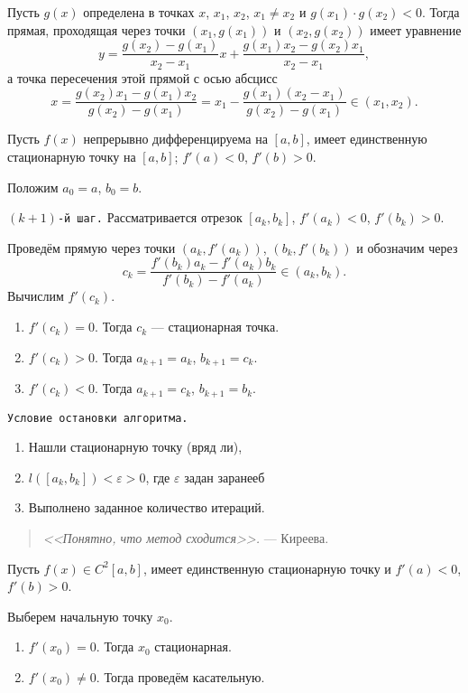 \begin{alg}
  \begin{remark*} Пусть $ g(x) $ определена в точках $ x $, $ x_1 $, $ x_2 $, $
    x_1 \neq x_2 $ и $ g(x_1)\cdot g(x_2) < 0 $. Тогда прямая, проходящая через
    точки $ (x_1, g(x_1)) $ и $ (x_2, g(x_2)) $ имеет уравнение  
    \[
        y = \frac{g(x_2) - g(x_1)}{x_2 - x_1} x + \frac{g(x_1)x_2 -
        g(x_2)x_1}{x_2 - x_1},
    \]
   а точка пересечения этой прямой с осью абсцисс  
   \[
       x = \frac{g(x_2)x_1 - g(x_1)x_2}{g(x_2) - g(x_1)} = x_1 -
       \frac{g(x_1)(x_2-x_1)}{g(x_2) - g(x_1)} \in (x_1, x_2).
   \]
 \end{remark*}

 Пусть $ f(x) $ непрерывно дифференцируема на $ [a,b] $, имеет единственную
 стационарную точку на $ [a, b] $; $ f'(a) < 0 $, $ f'(b) > 0 $.

 Положим $ a_0 = a $, $ b_0 = b $.

 \texttt{$ (k+1) $-й шаг.} Рассматривается отрезок $ [a_k, b_k] $, $ f'(a_k) < 0
 $, $ f'(b_k) > 0 $. 

 Проведём прямую через точки $ (a_k, f'(a_k)) $, $ (b_k, f'(b_k)) $ и обозначим
 через 
 \[
     c_k = \frac{f'(b_k)a_k - f'(a_k)b_k}{f'(b_k) - f'(a_k)} \in (a_k, b_k).
 \]
Вычислим $ f'(c_k) $.
\begin{enumerate}[label=(\roman*).]
  \item $f'(c_k) = 0$. Тогда $ c_k  $ --- стационарная точка.
  \item $ f'(c_k) > 0 $. Тогда $ a_{k+1} = a_k $, $ b_{k+1} = c_k $.
  \item $ f'(c_k) < 0 $. Тогда $ a_{k+1} = c_k $, $ b_{k+1} = b_k $.
\end{enumerate}

\texttt{Условие остановки алгоритма.}
\begin{enumerate}[label=(\alph*)]
  \item Нашли стационарную точку (вряд ли),
  \item $ l([a_k, b_k]) < \varepsilon > 0$, где $ \varepsilon $ задан заранееб
  \item Выполнено заданное количество итераций.
\end{enumerate}

\begin{quotation}
  \emph{<<Понятно, что метод сходится>>.}
  \flushbottom --- Киреева.
\end{quotation}
\end{alg}

\begin{alg}
  Пусть $ f(x) \in C^2[a,b] $, имеет единственную стационарную точку и $ f'(a) <
  0$, $ f'(b) > 0 $.

  Выберем начальную точку $ x_0 $.
  \begin{enumerate}[label=(\roman*)]
    \item $f'(x_0) = 0$. Тогда $ x_0 $ стационарная.
    \item $f'(x_0) \neq 0$. Тогда проведём касательную.
  \end{enumerate}
  
\end{alg}
